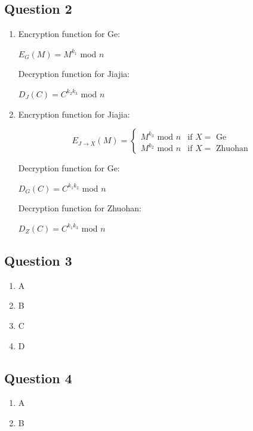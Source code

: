 \documentclass[12pt]{article}
\begin{document}
\subsection*{Question 2}
\begin{enumerate}

\item Encryption function for Ge:
\begin{center}
$E_{G}(M) = M^{k_{1}}$ mod $n$
\end{center}

Decryption function for Jiajia:
\begin{center}
$D_{J}(C) = C^{k_{2} k_{3}}$ mod $n$
\end{center}

\item Encryption function for Jiajia: 
\begin{center}
\[
  E_{J \rightarrow X}(M)=
  \begin{cases}
  	M^{k_{3}} \text{ mod } n & \text{if $X=$ Ge} \\
  	M^{k_{2}} \text{ mod } n & \text{if $X=$ Zhuohan}
  \end{cases}
\]
\end{center}

Decryption function for Ge:
\begin{center}
$D_{G}(C) = C^{k_{1} k_{2}}$ mod $n$
\end{center}

Decryption function for Zhuohan:
\begin{center}
$D_{Z}(C) = C^{k_{1} k_{3}}$ mod $n$
\end{center}


\end{enumerate}

\subsection*{Question 3}

\begin{enumerate}
\item A

\item B

\item C

\item D
\end{enumerate}

\subsection*{Question 4}
\begin{enumerate}
\item A

\item B
\end{enumerate}
\end{document}
